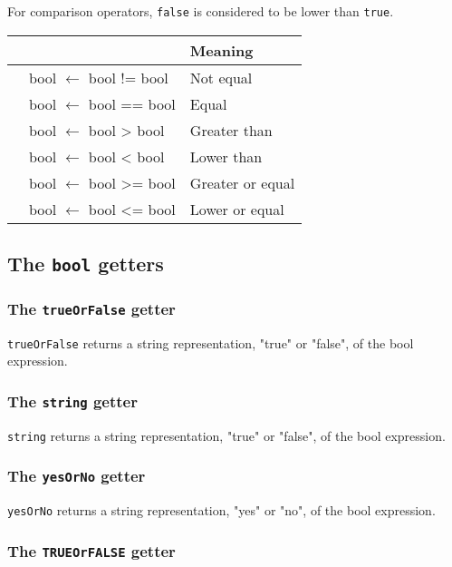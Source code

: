 \documentclass[10pt,openright,twosides,final]{memoir}
\newcommand{\scst}[1]{{\footnotesize\ttfamily\colorbox{light-blue}{"#1"}}}
\newcommand{\gtlinline}[1]{\colorbox{light-blue}{\lstinline[language=gtl]{#1}}}
\begin{document}
For comparison operators, \gtlinline{false} is considered to be lower than \gtlinline{true}.

\begin{longtable}{>{\ttfamily}l|>{\ttfamily}l|l}
{\bfseries Operator}&{\bfseries Expression type}&{\bfseries Meaning}\\
\hline\endhead
 {!=}&
  {bool $\leftarrow$ bool != bool}&
  {Not equal}\\
 {==}&
  {bool $\leftarrow$ bool == bool}&
  {Equal}\\
 {>}&
  {bool $\leftarrow$ bool > bool}&
  {Greater than}\\
 {<}&
  {bool $\leftarrow$ bool < bool}&
  {Lower than}\\
 {>=}&
  {bool $\leftarrow$ bool >= bool}&
  {Greater or equal}\\
 {<=}&
  {bool $\leftarrow$ bool <= bool}&
  {Lower or equal}\\
\end{longtable}

\subsection{The \texttt{bool} getters}

\subsubsection{The \texttt{trueOrFalse} getter}
\label{sec:trueOrFalseGetter}

\gtlinline{trueOrFalse} returns a string representation, \scst{true} or \scst{false}, of the bool expression.

\subsubsection{The \texttt{string} getter}

\gtlinline{string} returns a string representation, \scst{true} or \scst{false}, of the bool expression.

\subsubsection{The \texttt{yesOrNo} getter}

\gtlinline{yesOrNo} returns a string representation, \scst{yes} or \scst{no}, of the bool expression.

\subsubsection{The \texttt{TRUEOrFALSE} getter}
\label{sec:TRUEOrFALSEGetter}
\end{document}
